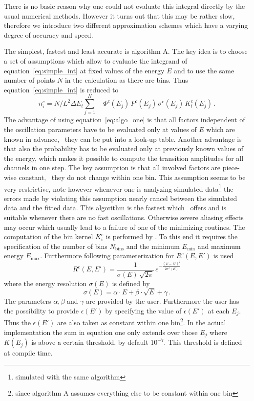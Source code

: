 There is no basic reason why one could not evaluate this integral directly
by the usual numerical methods. However it turns out that this may be rather
slow, therefore we introduce two different approximation schemes which have
a varying degree of accuracy and speed. 

The simplest, fastest and
least accurate is algorithm A. The key idea is to choose a set of assumptions
which allow to evaluate the integrand of equation~\ref{eq:simple_int}
at fixed values of the energy $E$ and to use the same number of points $N$ in
the calculation as there are bins. Thus equation~\ref{eq:simple_int} is reduced
to
\begin{equation}
\label{eq:algo_one}
n_i^c=N/L^2 \Delta E_i \sum_{j=1}^N \quad  \Phi^c(E_j)\,
P^c(E_j)\,
\sigma^c(E_j)\,
K_i^c(E_j)\,.
\end{equation}
The advantage of using equation~\ref{eq:algo_one} is that all factors
independent of the oscillation parameters have to be evaluated only at 
values of $E$ which are known in advance, \ie\ they can be put 
into a look-up table. Another advantage is that also the probability
has to be evaluated only at previously known values of the energy, which
makes it possible to compute the transition amplitudes for all channels
in one step. The key assumption is that all involved factors are piece-wise
constant, \ie\ they do not change within one bin. This assumption seems to be
very restrictive, note however whenever one is analyzing simulated 
data\footnote{simulated with the same algorithm} the errors
made by violating this assumption nearly cancel between the simulated 
data and the fitted data. This algorithm is the fastest which \GLOBES\ offers
and is suitable whenever there are no fast oscillations. Otherwise severe
aliasing effects may occur which usually lead to a failure of one of the 
minimizing routines. The computation of the bin kernel $K_i^c$ is performed
by \GLOBES. To this end it requires the specification of the number of bins
 $N_\mathrm{bins}$
and the minimum $E_\mathrm{min}$ and maximum energy $E_\mathrm{max}$. 
Furthermore following parameterization
for $R^c(E,E')$ is used
\begin{equation}
R^c(E,E')=\frac{1}{\sigma(E)\,\sqrt{2\pi}}\,e^{-\frac{(E-E')^2}{2\sigma^2(E)}}
\end{equation} 
where the energy resolution $\sigma(E)$ is defined by
\begin{equation}
\label{eq:sigma_e}
\sigma(E)=\alpha\cdot E + \beta \cdot \sqrt{E} +\gamma\,.
\end{equation}
The parameters $\alpha, \beta$ and $\gamma$ are provided by the user.
Furthermore the user has the possibility to provide 
$\epsilon(E')$ by specifying
the value of  $\epsilon(E')$ at each $E_j$. Thus the  $\epsilon(E')$ are
also taken as constant within one bin\footnote{since algorithm A assumes
everything else to be constant within one bin}. In the actual implementation 
the sum in equation one only extends over those $E_j$ where $K(E_j)$ 
is above a certain threshold, by default $10^{-7}$. This threshold is 
defined at compile time.



